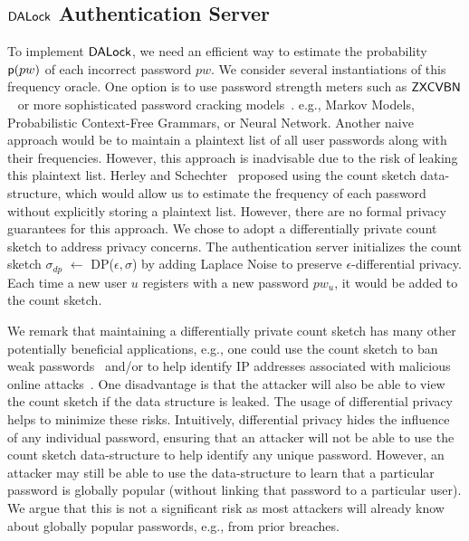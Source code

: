\subsection{$\mathsf{DALock}$ Authentication Server} %
To implement $\mathsf{DALock}$, we need an efficient way to estimate the probability $\textsf{p}(pw)$ of each incorrect password $pw$. We consider several instantiations of this frequency oracle. One option is to use password strength meters such as $\mathsf{ZXCVBN}$ ~\cite{USENIX:Wheeler16} or more sophisticated password cracking models~\cite{ USENIX:USBCCKKMMS15,USENIX:MUSKBCC16}. e.g., Markov Models, Probabilistic Context-Free Grammars, or Neural Network. Another naive approach would be to maintain a plaintext list of all user passwords along with their frequencies. However, this approach is inadvisable due to the risk of leaking this plaintext list. Herley and Schechter~\cite{HTS:SchHerMit10} proposed using the count sketch data-structure, which would allow us to estimate the frequency of each password without explicitly storing a plaintext list. However, there are no formal privacy guarantees for this approach. We chose to adopt a differentially private count sketch to address privacy concerns. The authentication server initializes the count sketch $\sigma_{dp}$ $\leftarrow$  DP($\epsilon, \sigma$) by adding Laplace Noise to preserve $\epsilon$-differential privacy. Each time a new user $u$ registers with a new password $pw_u$, it would be added to the count sketch.

We remark that maintaining a differentially private count sketch has many other potentially beneficial applications, e.g., one could use the count sketch to ban weak passwords~\cite{HTS:SchHerMit10} and/or to help identify IP addresses associated with malicious online attacks~\cite{EuroSP:THS19}. One disadvantage is that the attacker will also be able to view the count sketch if the data structure is leaked. The usage of differential privacy helps to minimize these risks. Intuitively, differential privacy hides the influence of any individual password, ensuring that an attacker will not be able to use the count sketch data-structure to help identify any unique password. However, an attacker may still be able to use the data-structure to learn that a particular password is globally popular (without linking that password to a particular user). We argue that this is not a significant risk as most attackers will already know about globally popular passwords, e.g., from prior breaches. 















